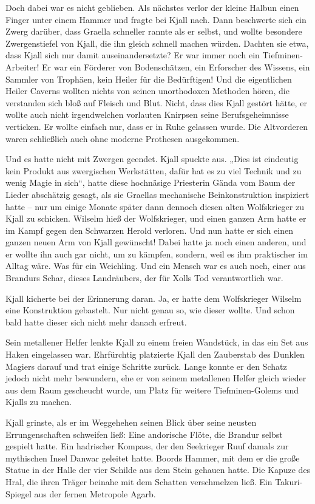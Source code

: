Doch dabei war es nicht geblieben. Als nächstes verlor der kleine Halbun einen Finger unter einem Hammer und fragte bei Kjall nach. Dann beschwerte sich ein Zwerg darüber, dass Graella schneller rannte als er selbst, und wollte besondere Zwergenstiefel von Kjall, die ihn gleich schnell machen würden. Dachten sie etwa, dass Kjall sich nur damit auseinandersetzte? Er war immer noch ein Tiefminen-Arbeiter! Er war ein Förderer von Bodenschätzen, ein Erforscher des Wissens, ein Sammler von Trophäen, kein Heiler für die Bedürftigen! Und die eigentlichen Heiler Caverns wollten nichts von seinen unorthodoxen Methoden hören, die verstanden sich bloß auf Fleisch und Blut. Nicht, dass dies Kjall gestört hätte, er wollte auch nicht irgendwelchen vorlauten Knirpsen seine Berufsgeheimnisse verticken. Er wollte einfach nur, dass er in Ruhe gelassen wurde. Die Altvorderen waren schließlich auch ohne moderne Prothesen ausgekommen.

Und es hatte nicht mit Zwergen geendet. Kjall spuckte aus. „Dies ist eindeutig kein Produkt aus zwergischen Werkstätten, dafür hat es zu viel Technik und zu wenig Magie in sich“, hatte diese hochnäsige Priesterin Gända vom Baum der Lieder abschätzig gesagt, als sie Graellas mechanische Beinkonstruktion inspiziert hatte – nur um einige Monate später dann dennoch diesen alten Wolfskrieger zu Kjall zu schicken. Wilselm hieß der Wolfskrieger, und einen ganzen Arm hatte er im Kampf gegen den Schwarzen Herold verloren. Und nun hatte er sich einen ganzen neuen Arm von Kjall gewünscht! Dabei hatte ja noch einen anderen, und er wollte ihn auch gar nicht, um zu kämpfen, sondern, weil es ihm praktischer im Alltag wäre. Was für ein Weichling. Und ein Mensch war es auch noch, einer aus Brandurs Schar, dieses Landräubers, der für Xolls Tod verantwortlich war.

Kjall kicherte bei der Erinnerung daran. Ja, er hatte dem Wolfskrieger Wilselm eine Konstruktion gebastelt. Nur nicht genau so, wie dieser wollte. Und schon bald hatte dieser sich nicht mehr danach erfreut.

Sein metallener Helfer lenkte Kjall zu einem freien Wandstück, in das ein Set aus Haken eingelassen war. Ehrfürchtig platzierte Kjall den Zauberstab des Dunklen Magiers darauf und trat einige Schritte zurück. Lange konnte er den Schatz jedoch nicht mehr bewundern, ehe er von seinem metallenen Helfer gleich wieder aus dem Raum gescheucht wurde, um Platz für weitere Tiefminen-Golems und Kjalls zu machen.

Kjall grinste, als er im Weggehehen seinen Blick über seine neusten Errungenschaften schweifen ließ: Eine andorische Flöte, die Brandur selbst gespielt hatte. Ein hadrischer Kompass, der den Seekrieger Ruuf damals zur mythischen Insel Danwar geleitet hatte. Boords Hammer, mit dem er die große Statue in der Halle der vier Schilde aus dem Stein gehauen hatte. Die Kapuze des Hral, die ihren Träger beinahe mit dem Schatten verschmelzen ließ. Ein Takuri-Spiegel aus der fernen Metropole Agarb.

